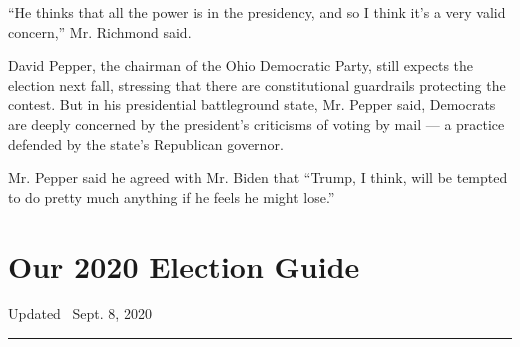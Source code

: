 ``He thinks that all the power is in the presidency, and so I think it's
a very valid concern,'' Mr. Richmond said.

David Pepper, the chairman of the Ohio Democratic Party, still expects
the election next fall, stressing that there are constitutional
guardrails protecting the contest. But in his presidential battleground
state, Mr. Pepper said, Democrats are deeply concerned by the
president's criticisms of voting by mail --- a practice defended by the
state's Republican governor.

Mr. Pepper said he agreed with Mr. Biden that ``Trump, I think, will be
tempted to do pretty much anything if he feels he might lose.''

\hypertarget{our-2020-election-guide}{%
\section{Our 2020 Election Guide}\label{our-2020-election-guide}}

Updated ~Sept. 8, 2020

\begin{center}\rule{0.5\linewidth}{\linethickness}\end{center}


